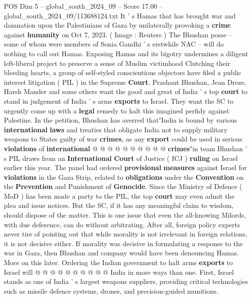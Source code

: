 \begin{textsample}{POS Dim 5 – global\_south\_2024\_09 – Score 17.00 – global\_south\_2024\_09/113688124.txt}  \label{ex:f5_pos_231}
It ' s Hamas that has brought war and damnation upon the Palestinians of Gaza by unilaterally provoking a \textbf{crime} against \textbf{humanity} on Oct 7, 2023. ( Image : Reuters ) The Bhushan posse -- some of whom were members of Sonia Gandhi ' s erstwhile NAC -- will do nothing to call out Hamas.
Exposing Hamas and its bigotry undermines a diligent left-liberal project to preserve a sense of Muslim victimhood Clutching their bleeding hearts, a group of self-styled conscientious objectors have filed a public interest litigation ( PIL ) in the Supreme \textbf{Court}.
Prashant Bhushan, Jean Dreze, Harsh Mander and some others want the good and great of India ' s top \textbf{court} to stand in judgement of India ' s arms \textbf{exports} to Israel.
They want the SC to urgently come up with a \textbf{legal} remedy to halt this imagined perfidy against Palestine.
In the petition, Bhushan has averred that"India is bound by various \textbf{international} \textbf{laws} and treaties that obligate India not to supply military weapons to States guilty of war \textbf{crimes}, as any \textbf{export} could be used in serious \textbf{violations} of \textbf{international} @ @ @ @ @ @ @ @ @ @ \textbf{crimes}"in team Bhushan ' s PIL draws from an \textbf{International} \textbf{Court} of Justice ( ICJ ) \textbf{ruling} on Israel earlier this year.
The panel had ordered \textbf{provisional} \textbf{measures} against Israel for \textbf{violations} in the Gaza Strip, related to \textbf{obligations} under the \textbf{Convention} on the \textbf{Prevention} and Punishment of \textbf{Genocide}.
Since the Ministry of Defence ( MoD ) has been made a party to the PIL, the top \textbf{court} may even admit the plea and issue notices.
But the SC, if it has any meaningful claim to wisdom, should dispose of the matter.
This is one issue that even the all-knowing Milords, with due deference, can do without arbitrating.
After all, foreign policy experts never tire of pointing out that while morality is not irrelevant in foreign relations, it is not decisive either.
If morality was decisive in formulating a response to the war in Gaza, then Bhushan and company would have been denouncing Hamas.
More on this later.
Ordering the Indian government to halt arms \textbf{exports} to Israel will @ @ @ @ @ @ @ @ @ @ India in more ways than one.
First, Israel stands as one of India ' s largest weapons suppliers, providing critical technologies such as missile defence systems, drones, and precision-guided munitions.

\end{textsample}
